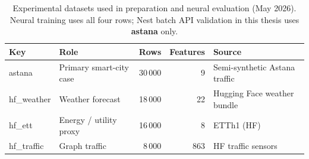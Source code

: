 
\begin{table}[H]
  \centering
  \caption{Experimental datasets used in preparation and neural evaluation (May 2026). Neural training uses all four rows; Nest batch API validation in this thesis uses \textbf{astana} only.}
  \label{tab:phase4_datasets}
  \small
  \begin{tabular}{@{}llrrl@{}}
    \toprule
    \textbf{Key} & \textbf{Role} & \textbf{Rows} & \textbf{Features} & \textbf{Source} \\
    \midrule
    astana & Primary smart-city case & 30\,000 & 9 & Semi-synthetic Astana traffic \\
    hf\_weather & Weather forecast & 18\,000 & 22 & Hugging Face weather bundle \\
    hf\_ett & Energy / utility proxy & 16\,000 & 8 & ETTh1 (HF) \\
    hf\_traffic & Graph traffic & 8\,000 & 863 & HF traffic sensors \\
    \bottomrule
  \end{tabular}
\end{table}
